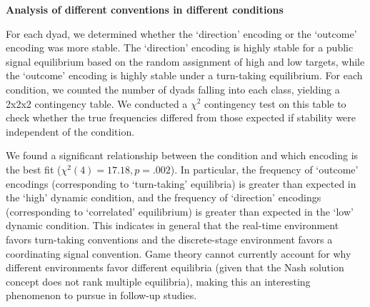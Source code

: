 \documentclass[11pt, oneside]{article}   	%
\begin{document}
\noindent\textbf{Analysis of different conventions in different conditions}


For each dyad, we determined whether the `direction' encoding or the `outcome' encoding was more stable. The `direction' encoding is highly stable for a public signal equilibrium based on the random assignment of high and low targets, while the `outcome' encoding is highly stable under a turn-taking equilibrium. For each condition, we counted the number of dyads falling into each class, yielding a 2x2x2 contingency table. We conducted a $\chi^2$ contingency test on this table to check whether the true frequencies differed from those expected if stability were independent of the condition. 

We found a significant relationship between the condition and which encoding is the best fit ($\chi^2(4) = 17.18, p = .002$). In particular, the frequency of `outcome' encodings (corresponding to `turn-taking' equilibria) is greater than expected in the `high' dynamic condition, and the frequency of `direction' encodings (corresponding to `correlated' equilibrium) is greater than expected in the `low' dynamic condition. This indicates in general that the real-time environment favors turn-taking conventions and the discrete-stage environment favors a coordinating signal convention. Game theory cannot  currently account for why different environments favor different equilibria (given that the Nash solution concept does not rank multiple equilibria), making this an interesting phenomenon to pursue in follow-up studies. 
\end{document}
